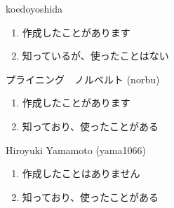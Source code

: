 \begin{prework}{ koedoyoshida }
  \begin{enumerate}
  \item 作成したことがあります
  \item 知っているが、使ったことはない
  \end{enumerate}
\end{prework}

\begin{prework}{ プライニング　ノルベルト (norbu) }
  \begin{enumerate}
  \item 作成したことがあります
  \item 知っており、使ったことがある
  \end{enumerate}
\end{prework}

\begin{prework}{ Hiroyuki Yamamoto (yama1066) }
  \begin{enumerate}
  \item 作成したことはありません
  \item 知っており、使ったことがある
  \end{enumerate}
\end{prework}

